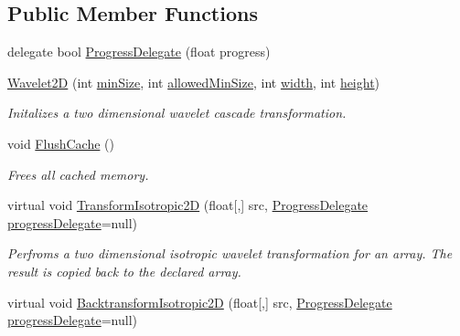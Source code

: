 \subsection*{\-Public \-Member \-Functions}
\begin{DoxyCompactItemize}
\item 
delegate bool \hyperlink{class_turbo_wavelets_1_1_wavelet2_d_aec52fe74aa08e073119064ef4ac3fe93}{\-Progress\-Delegate} (float progress)
\item 
\hyperlink{class_turbo_wavelets_1_1_wavelet2_d_a5156da3a3376121d64967dd8cd75725b}{\-Wavelet2\-D} (int \hyperlink{class_turbo_wavelets_1_1_wavelet2_d_af5148ef1a46dd5694ccea13aa8f1b9e2}{min\-Size}, int \hyperlink{class_turbo_wavelets_1_1_wavelet2_d_a949bac2b4f540092cf7cc8916968cdc0}{allowed\-Min\-Size}, int \hyperlink{class_turbo_wavelets_1_1_wavelet2_d_aaa4b3711957fe1798980e6891331a08d}{width}, int \hyperlink{class_turbo_wavelets_1_1_wavelet2_d_afb2aa87b89b82f329357cbdc0cde18a8}{height})
\begin{DoxyCompactList}\small\item\em \-Initalizes a two dimensional wavelet cascade transformation. \end{DoxyCompactList}\item 
void \hyperlink{class_turbo_wavelets_1_1_wavelet2_d_a727e557f207cf861b10c38f1f1a91b52}{\-Flush\-Cache} ()
\begin{DoxyCompactList}\small\item\em \-Frees all cached memory. \end{DoxyCompactList}\item 
virtual void \hyperlink{class_turbo_wavelets_1_1_wavelet2_d_ac647a989c2b66ca08a8b7e4196cbc547}{\-Transform\-Isotropic2\-D} (float\mbox{[},\mbox{]} src, \hyperlink{class_turbo_wavelets_1_1_wavelet2_d_aec52fe74aa08e073119064ef4ac3fe93}{\-Progress\-Delegate} \hyperlink{class_turbo_wavelets_1_1_wavelet2_d_a41d9135f22a6b2cb661b2cc2ccb768ff}{progress\-Delegate}=null)
\begin{DoxyCompactList}\small\item\em \-Perfroms a two dimensional isotropic wavelet transformation for an array. \-The result is copied back to the declared array. \end{DoxyCompactList}\item 
virtual void \hyperlink{class_turbo_wavelets_1_1_wavelet2_d_ac1644fb0d5f8a2ba8f265b445cba454b}{\-Backtransform\-Isotropic2\-D} (float\mbox{[},\mbox{]} src, \hyperlink{class_turbo_wavelets_1_1_wavelet2_d_aec52fe74aa08e073119064ef4ac3fe93}{\-Progress\-Delegate} \hyperlink{class_turbo_wavelets_1_1_wavelet2_d_a41d9135f22a6b2cb661b2cc2ccb768ff}{progress\-Delegate}=null)

\end{DoxyCompactItemize}
